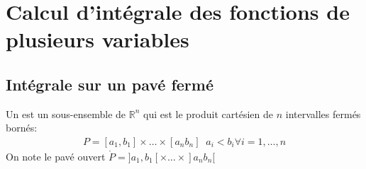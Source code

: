 \chapter{Calcul d'intégrale des fonctions de plusieurs variables}

\section{Intégrale sur un pavé fermé}
\begin{definition}
    Un  est un sous-ensemble de $\mathbb{R}^{n}$ qui est le produit cartésien de $n$ intervalles fermés bornés:
    \begin{align*} P =  \left[a_1, b_1\right] \times \ldots \times \left[a_n b_n\right] \; \; a_i < b_i \forall i = 1, \ldots, n\end{align*}
    On note le pavé ouvert $\mathring{P} =  ] a_1, b_1 [ \times \ldots \times ] a_n b_n [$
\end{definition}

